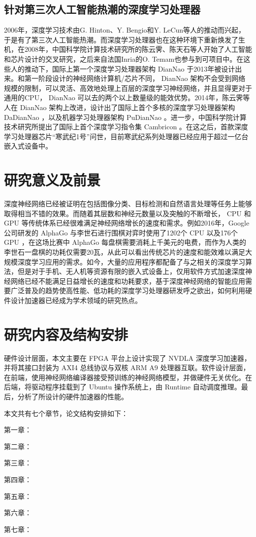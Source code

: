 \subsection{针对第三次人工智能热潮的深度学习处理器}
2006年，深度学习技术由G. Hinton、Y. Bengio和Y. LeCun等人的推动而兴起，于是有了第三次人工智能热潮。而深度学习处理器也在这种环境下重新焕发了生机，在2008年，中国科学院计算技术研究所的陈云霁、陈天石等人开始了人工智能和芯片设计的交叉研究，之后来自法国Inria的O. Temam也参与到可项目中。在这些人的推动下，国际上第一个深度学习处理器架构 DianNao 于2013年被设计出来。和第一阶段设计的神经网络计算机/芯片不同， DianNao 架构不会受到网络规模的限制，可以灵活、高效地处理上百层的深度学习神经网络，并且显得更对于通用的CPU， DianNao 可以去的两个以上数量级的能效优势。2014年，陈云霁等人在 DianNao 架构上改进，设计出了国际上首个多核的深度学习处理器架构 DaDianNao ，以及机器学习处理器架构 PuDianNao 。进一步，中国科学院计算技术研究所提出了国际上首个深度学习指令集 Cambricon 。在这之后，首款深度学习处理器芯片“寒武纪1号”问世，目前寒武纪系列处理器已经应用于超过一亿台嵌入式设备中。


\section{研究意义及前景}

深度神经网络已经被证明在包括图像分类、目标检测和自然语言处理等任务上能够取得相当不错的效果。而随着其层数和神经元数量以及突触的不断增长， CPU 和 GPU 等传统体系已经很难满足神经网络增长的速度和需求。例如2016年，Google公司研发的 AlphaGo 与李世石进行围棋对弈时使用了1202个 CPU 以及176个 GPU ，在这场比赛中 AlphaGo 每盘棋需要消耗上千美元的电费，而作为人类的李世石一盘棋的功耗仅需要20瓦，从此可以看出传统芯片的速度和能效难以满足大规模深度学习应用的需求。如今，大量的应用程序都配备了与之相关的深度学习算法，但是对于手机、无人机等资源有限的嵌入式设备上，仅用软件方式加速深度神经网络已经不能满足日益增长的速度和功耗要求，基于深度神经网络的智能应用需要广泛普及的趋势使高性能、低功耗的深度学习处理器研发呼之欲出，如何利用硬件设计加速器已经成为学术领域的研究热点。

\section{研究内容及结构安排}

硬件设计层面，本文主要在 FPGA 平台上设计实现了 NVDLA 深度学习加速器，并将其接口封装为 AXI4 总线协议与双核 ARM A9 处理器互联。软件设计层面，在前端，使用神经网络编译器接受预训练的神经网络模型，并做硬件无关优化。在后端，将驱动程序挂载到了 Ubuntu 操作系统上，由 Runtime 自动调度推理。最后，分析了所设计的硬件加速器的性能。

本文共有七个章节，论文结构安排如下：

第一章：

第二章：

第三章：

第四章：

第五章：

第六章：

第七章：



